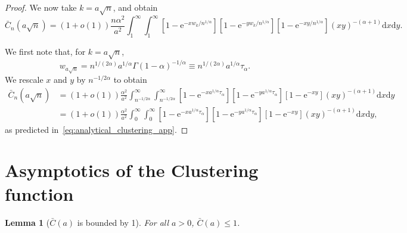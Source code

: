 \documentclass[ twocolumn,
 amsmath,amssymb,
 aps, pre, amsthm, amsfonts,
]{revtex4-2}
\newtheorem{lemma}{Lemma}
\newcommand{\e}{\mathrm{e}}
\newcommand{\nn}{\nonumber}
\begin{document}
\begin{proof}
We now take $k=a\sqrt{n}$, and obtain 
\begin{equation}
    \bar{C}_n(a\sqrt{n})=(1+o(1))\frac{n\alpha^2}{a^2} \int_1^{\infty} \int_1^{\infty}[1-\e^{-xw_k/n^{1/\alpha}}][1-\e^{-yw_k/n^{1/\alpha}}][1-\e^{-xy/n^{1/\alpha}}](xy)^{-(\alpha+1)}
	{\mathrm d}x {\mathrm d}y.
\end{equation}

We first note that, for $k=a\sqrt{n}$,
\begin{equation}
    w_{a\sqrt{n}}=n^{1/(2\alpha)} a^{1/\alpha} \Gamma(1-\alpha)^{-1/\alpha}
	\equiv n^{1/(2\alpha)} a^{1/\alpha} {\tau_\alpha}.
\end{equation}
We rescale $x$ and $y$ by $n^{-1/2\alpha}$ to obtain
\begin{align}
    \bar{C}_n(a\sqrt{n}) & =(1+o(1))\frac{\alpha^2}{a^2} \int_{n^{-1/2\alpha}}^{\infty} \int_{n^{-1/2\alpha}}^{\infty}[1-\e^{-xa^{1/\alpha} {\tau_\alpha}}][1-\e^{-ya^{1/\alpha} {\tau_\alpha}}][1-\e^{-xy}](xy)^{-(\alpha+1)}
	{\mathrm d}x {\mathrm d}y \\
	& =(1+o(1))\frac{\alpha^2}{a^2} \int_{0}^{\infty} \int_{0}^{\infty}[1-\e^{-xa^{1/\alpha} {\tau_\alpha}}][1-\e^{-ya^{1/\alpha} {\tau_\alpha}}][1-\e^{-xy}](xy)^{-(\alpha+1)}
	{\mathrm d}x {\mathrm d}y,\nn
\end{align}
as predicted in~\eqref{eq:analytical_clustering_app}.
\end{proof}



\section{Asymptotics of the Clustering function}
\label{app:asymptotics}


\begin{lemma}[$\bar{C}(a)$ is bounded by 1]
\label{lem-annealed-bd-1}
For all $a>0$, $\bar{C}(a)\leq 1$.
\end{lemma}
\end{document}
